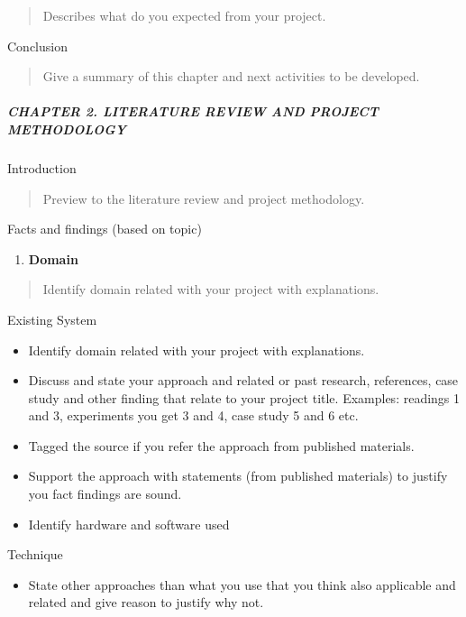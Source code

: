 \begin{quote}
Describes what do you expected from your project.
\end{quote}

Conclusion

\begin{quote}
Give a summary of this chapter and next activities to be developed.
\end{quote}

\subparagraph{CHAPTER 2. LITERATURE REVIEW AND PROJECT
METHODOLOGY}\label{chapter-2.-literature-review-and-project-methodology}

Introduction

\begin{quote}
Preview to the literature review and project methodology.
\end{quote}

Facts and findings (based on topic)

\begin{enumerate}
\def\labelenumi{\arabic{enumi}.}
\item
  \textbf{Domain}
\end{enumerate}

\begin{quote}
Identify domain related with your project with explanations.
\end{quote}

Existing System

\begin{itemize}
\item
  Identify domain related with your project with explanations.
\item
  Discuss and state your approach and related or past research,
  references, case study and other finding that relate to your project
  title. Examples: readings 1 and 3, experiments you get 3 and 4, case
  study 5 and 6 etc.
\item
  Tagged the source if you refer the approach from published materials.
\item
  Support the approach with statements (from published materials) to
  justify you fact findings are sound.
\item
  Identify hardware and software used
\end{itemize}

Technique

\begin{itemize}
\item
  State other approaches than what you use that you think also
  applicable and related and give reason to justify why not.
\end{itemize}

